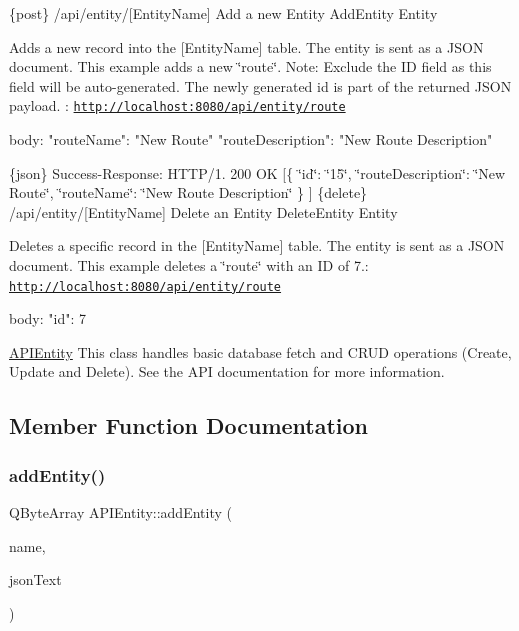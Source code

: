 \{post\} /api/entity/\mbox{[}Entity\+Name\mbox{]} Add a new Entity  Add\+Entity  Entity

Adds a new record into the \mbox{[}Entity\+Name\mbox{]} table. The entity is sent as a J\+S\+ON document.  This example adds a new \char`\"{}route\char`\"{}. Note\+: Exclude the ID field as this field will be auto-\/generated. The newly generated id is part of the returned J\+S\+ON payload. \+: \href{http://localhost:8080/api/entity/route}{\tt http\+://localhost\+:8080/api/entity/route} \begin{DoxyVerb}body:
{
  "routeName": "New Route"
  "routeDescription": "New Route Description"
}
\end{DoxyVerb}


\{json\} Success-\/\+Response\+: H\+T\+T\+P/1. 200 OK \mbox{[}\{ \char`\"{}id\char`\"{}\+: \char`\"{}15\char`\"{}, \char`\"{}route\+Description\char`\"{}\+: \char`\"{}\+New Route\char`\"{}, \char`\"{}route\+Name\char`\"{}\+: \char`\"{}\+New Route Description\char`\"{} \} \mbox{]}  \{delete\} /api/entity/\mbox{[}Entity\+Name\mbox{]} Delete an Entity  Delete\+Entity  Entity

Deletes a specific record in the \mbox{[}Entity\+Name\mbox{]} table. The entity is sent as a J\+S\+ON document.  This example deletes a \char`\"{}route\char`\"{} with an ID of 7.\+: \href{http://localhost:8080/api/entity/route}{\tt http\+://localhost\+:8080/api/entity/route} \begin{DoxyVerb}body:
{
  "id": 7
}\end{DoxyVerb}
 \hyperlink{class_a_p_i_entity}{A\+P\+I\+Entity} This class handles basic database fetch and C\+R\+UD operations (Create, Update and Delete). See the A\+PI documentation for more information. 

\subsection{Member Function Documentation}
\mbox{\label{class_a_p_i_entity_a8bbe43bbc389472d7a7fd9e8a2283c82}} 
\subsubsection{\texorpdfstring{add\+Entity()}{addEntity()}}
{\footnotesize\ttfamily Q\+Byte\+Array A\+P\+I\+Entity\+::add\+Entity (\begin{DoxyParamCaption}\item[{const Q\+String \&}]{name,  }\item[{const Q\+String \&}]{json\+Text }\end{DoxyParamCaption})}

